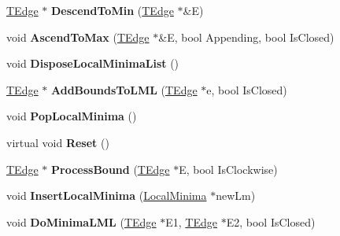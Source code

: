 \begin{DoxyCompactItemize}
\hyperlink{structClipperLib_1_1TEdge}{T\+Edge} $\ast$ {\bfseries Descend\+To\+Min} (\hyperlink{structClipperLib_1_1TEdge}{T\+Edge} $\ast$\&E)
\item 
\mbox{\label{classClipperLib_1_1ClipperBase_afafbf0dafffb5ad6f5a5c30dbed6378f}} 
void {\bfseries Ascend\+To\+Max} (\hyperlink{structClipperLib_1_1TEdge}{T\+Edge} $\ast$\&E, bool Appending, bool Is\+Closed)
\item 
\mbox{\label{classClipperLib_1_1ClipperBase_a311dbbec1454ab7965e363a0359f5ee4}} 
void {\bfseries Dispose\+Local\+Minima\+List} ()
\item 
\mbox{\label{classClipperLib_1_1ClipperBase_a906ea17c9dc8822d689e54c3243e7f58}} 
\hyperlink{structClipperLib_1_1TEdge}{T\+Edge} $\ast$ {\bfseries Add\+Bounds\+To\+L\+ML} (\hyperlink{structClipperLib_1_1TEdge}{T\+Edge} $\ast$e, bool Is\+Closed)
\item 
\mbox{\label{classClipperLib_1_1ClipperBase_a9554e9f2273c39e0f5f07d3cd73533e6}} 
void {\bfseries Pop\+Local\+Minima} ()
\item 
\mbox{\label{classClipperLib_1_1ClipperBase_a18aca5f7df2587be841f1dd889d56744}} 
virtual void {\bfseries Reset} ()
\item 
\mbox{\label{classClipperLib_1_1ClipperBase_a294f3035a78c376e8067ee1f5023fae2}} 
\hyperlink{structClipperLib_1_1TEdge}{T\+Edge} $\ast$ {\bfseries Process\+Bound} (\hyperlink{structClipperLib_1_1TEdge}{T\+Edge} $\ast$E, bool Is\+Clockwise)
\item 
\mbox{\label{classClipperLib_1_1ClipperBase_aa62506f423172bccd6de8a645cc29cff}} 
void {\bfseries Insert\+Local\+Minima} (\hyperlink{structClipperLib_1_1LocalMinima}{Local\+Minima} $\ast$new\+Lm)
\item 
\mbox{\label{classClipperLib_1_1ClipperBase_ae57efb542cfbbc42d000815e8a2e2877}} 
void {\bfseries Do\+Minima\+L\+ML} (\hyperlink{structClipperLib_1_1TEdge}{T\+Edge} $\ast$E1, \hyperlink{structClipperLib_1_1TEdge}{T\+Edge} $\ast$E2, bool Is\+Closed)

\end{DoxyCompactItemize}
